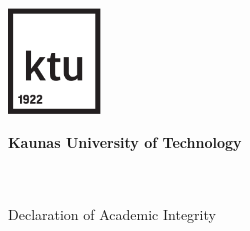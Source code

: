 
\begin{titlepage}
   \begin{center}
   	 

        \vspace*{0.3cm}
        \includegraphics[width=2.46cm]{images/ktu-ikona.pdf}
        \vspace{0.3cm}

       \textbf{Kaunas University of Technology}
        \\ \projectFaculty
        \\ \projectAuthorName
        
        \vspace{2cm}
        
       \LARGE
	\textbf{\expandafter\capitalisewords\expandafter{\projectTitle}} \\
        \large
        Declaration of Academic Integrity        	       
               

       \vspace{1cm}
       \end{center}


\end{titlepage}

